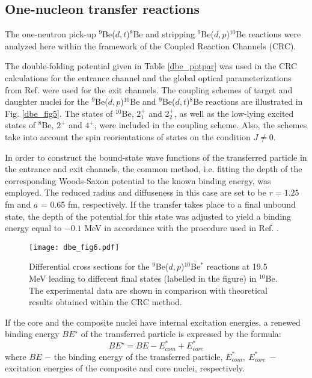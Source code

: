 \documentclass[
12pt, %
oneside, %
english, %
onehalfspacing, %
onehalfspacing, %
headsepline, %
]{MastersDoctoralThesis} %
\begin{document}
\subsection{One-nucleon transfer reactions }

The one-neutron pick-up ${}^9$Be($d,t$)${}^8$Be and stripping ${}^9$Be($d,p$)${}^{10}$Be reactions were analyzed here within the framework of  the Coupled Reaction Channels (CRC).

The double-folding potential given in Table \ref{dbe_potpar} was used in the CRC calculations for the entrance channel and the global optical parameterizations from Ref. \cite{globalProton, globalTriton} were used for the exit channels. The coupling schemes of target and daughter nuclei for the ${}^9$Be($d,p$)${}^{10}$Be and ${}^9$Be($d,t$)${}^8$Be  reactions  are illustrated in Fig. \ref{dbe_fig5}. The states of ${}^{10}$Be, $2^+_{1}$ and $2^+_{2}$, as well as the low-lying excited states of ${}^8$Be, $2^+$ and $4^+$, were included in the coupling scheme. Also, the schemes take into account the spin reorientations of states on the condition $J \neq 0$.

In order to construct the bound-state wave functions of the transferred particle in the entrance and exit channels, the common method, i.e. fitting the depth of the corresponding Woods-Saxon potential to the known binding energy, was employed. The reduced radius and diffuseness in this case are set to be $r = 1.25$ fm and $a$ = 0.65 fm, respectively. If the transfer takes place to a final unbound state, the depth of the potential for this state was adjusted to yield a binding energy equal to $-0.1$ MeV in accordance with the procedure used in Ref. \cite{harakeh1980strong}.

\begin{figure}[tp]
\centering
\texttt{[image: dbe\_fig6.pdf]}
\decoRule
\caption{\label{dbe_fig6} \footnotesize Differential cross sections for the ${}^9$Be($d,p$)${}^{10}$Be$^*$ reactions at 19.5 MeV leading to different final states (labelled in the figure) in ${}^{10}$Be. The experimental data are shown in comparison with theoretical results obtained within the CRC method.}
\end{figure}

If the core and the composite nuclei have internal excitation energies, a renewed binding energy $BE^{\star}$ of the transferred particle is expressed by the formula:
\begin{equation} BE^{\star}=BE - E_{com}^*+E_{core}^* \end{equation}
where $BE$ $-$ the binding energy of the transferred particle, $E_{com}^*,~E_{core}^*~-$  excitation energies of the composite and  core nuclei, respectively.
\end{document}
